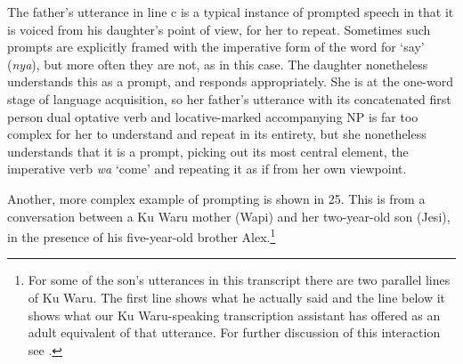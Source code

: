\documentclass[output=paper]{langsci/langscibook}
\begin{document}
The father’s utterance in line c is a typical instance of prompted speech in that it is voiced from his daughter’s point of view, for her to repeat. Sometimes such prompts are explicitly framed with the imperative form of the word for ‘say’ (\textit{nya}), but more often they are not, as in this case. The daughter nonetheless understands this as a prompt, and responds appropriately. She is at the one-word stage of language acquisition, so her father’s utterance with its concatenated first person dual optative verb and locative-marked accompanying NP is far too complex for her to understand and repeat in its entirety, but she nonetheless understands that it is a prompt, picking out its most central element, the imperative verb \textit{wa} ‘come’ and repeating it as if from her own viewpoint.

Another, more complex example of prompting is shown in 25. This is from a conversation between a Ku Waru mother (Wapi) and her two-year-old son (Jesi), in the presence of his five-year-old brother Alex.\footnote{ For some of the son’s utterances in this transcript there are two parallel lines of Ku Waru. The first line shows what he actually said and the line below it shows what our Ku Waru-speaking transcription assistant has offered as an adult equivalent of that utterance.  For further discussion of this interaction see \cite{Rumsey2014}.}
\end{document}
